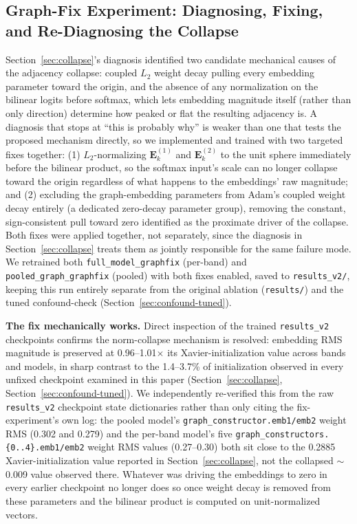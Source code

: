 \documentclass[journal]{IEEEtran}
\begin{document}
\FloatBarrier

\subsection{Graph-Fix Experiment: Diagnosing, Fixing, and Re-Diagnosing the Collapse}
\label{sec:graphfix}

Section~\ref{sec:collapse}'s diagnosis identified two candidate mechanical causes of the adjacency collapse: coupled $L_2$ weight decay pulling every embedding parameter toward the origin, and the absence of any normalization on the bilinear logits before softmax, which lets embedding magnitude itself (rather than only direction) determine how peaked or flat the resulting adjacency is. A diagnosis that stops at ``this is probably why'' is weaker than one that tests the proposed mechanism directly, so we implemented and trained with two targeted fixes together: (1) $L_2$-normalizing $\mathbf{E}^{(1)}_k$ and $\mathbf{E}^{(2)}_k$ to the unit sphere immediately before the bilinear product, so the softmax input's scale can no longer collapse toward the origin regardless of what happens to the embeddings' raw magnitude; and (2) excluding the graph-embedding parameters from Adam's coupled weight decay entirely (a dedicated zero-decay parameter group), removing the constant, sign-consistent pull toward zero identified as the proximate driver of the collapse. Both fixes were applied together, not separately, since the diagnosis in Section~\ref{sec:collapse} treats them as jointly responsible for the same failure mode. We retrained both \texttt{full\_model\_graphfix} (per-band) and \texttt{pooled\_graph\_graphfix} (pooled) with both fixes enabled, saved to \texttt{results\_v2/}, keeping this run entirely separate from the original ablation (\texttt{results/}) and the tuned confound-check (Section~\ref{sec:confound-tuned}).

\textbf{The fix mechanically works.} Direct inspection of the trained \texttt{results\_v2} checkpoints confirms the norm-collapse mechanism is resolved: embedding RMS magnitude is preserved at 0.96--1.01$\times$ its Xavier-initialization value across bands and models, in sharp contrast to the 1.4--3.7\% of initialization observed in every unfixed checkpoint examined in this paper (Section~\ref{sec:collapse}, Section~\ref{sec:confound-tuned}). We independently re-verified this from the raw \texttt{results\_v2} checkpoint state dictionaries rather than only citing the fix-experiment's own log: the pooled model's \texttt{graph\_constructor.emb1/emb2} weight RMS (0.302 and 0.279) and the per-band model's five \texttt{graph\_constructors.\{0..4\}.emb1/emb2} weight RMS values (0.27--0.30) both sit close to the 0.2885 Xavier-initialization value reported in Section~\ref{sec:collapse}, not the collapsed $\sim$0.009 value observed there. Whatever was driving the embeddings to zero in every earlier checkpoint no longer does so once weight decay is removed from these parameters and the bilinear product is computed on unit-normalized vectors.
\end{document}

